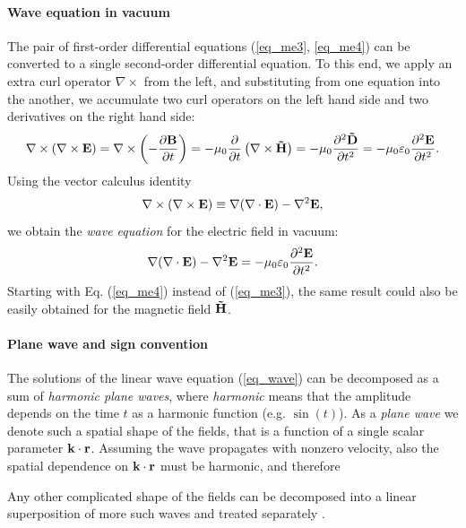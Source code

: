 \paragraph{Wave equation in vacuum} The pair of first-order differential equations (\ref{eq_me3}, \ref{eq_me4}) can be converted to a single second-order differential equation. To this end, we apply an extra curl operator $\nabla\times$ from the left, and substituting from one equation into the another, we accumulate two curl operators on the left hand side and two derivatives on the right hand side: %
\begin{equation} \nabla\times (\nabla\times \mathbf{E}) = \nabla\times \left(- \frac{\partial \mathbf{B}} {\partial t}\right) = -\mu_0 \frac{\partial}{\partial t} \left(\nabla\times \mathbf{\tilde{H}}\right) 
= -\mu_0 \frac{\partial^{2} \mathbf{\tilde{D}}}{\partial t^{2}} = -\mu_0 \varepsilon_0 \frac{\partial^{2} \mathbf{E}}{\partial t^{2}}.  \label{eq_elim}\end{equation}
Using the vector calculus identity
\begin{equation} \nabla\times (\nabla\times \mathbf{E}) \equiv \nabla (\nabla \cdot \mathbf{E}) - \nabla^2 \mathbf{E}, \label{eq_rotrot}\end{equation}
we obtain the \textit{wave equation} for the electric field in vacuum: 
\begin{equation}  \nabla (\nabla \cdot \mathbf{E}) - \nabla^2 \mathbf{E} = -\mu_0 \varepsilon_0 \frac{\partial^{2} \mathbf{E}}{\partial t^{2}}.  \label{eq_wave}\end{equation}
Starting with Eq. (\ref{eq_me4}) instead of (\ref{eq_me3}), the same result could also be easily obtained for the magnetic field $\mathbf{\tilde{H}}$.
\paragraph{Plane wave and sign convention} %
The solutions of the linear wave equation (\ref{eq_wave}) can be decomposed as a sum of \textit{harmonic plane waves}, where \textit{harmonic} means that the amplitude depends on the time $t$ as a harmonic function (e.g. $\sin(t)$). As a \textit{plane wave} we denote such a spatial shape of the fields, that is a function of a single  scalar parameter ${\mathbf{k}}\cdot{\mathbf{r}}$. Assuming the wave propagates with nonzero velocity, also the spatial dependence on  ${\mathbf{k}}\cdot{\mathbf{r}}$ must be harmonic, and therefore 

Any other complicated shape of the fields can be decomposed into a linear superposition of more such waves and treated separately \cite{jackson1962book}. 

